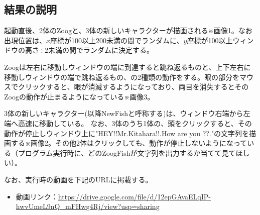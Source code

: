 \documentclass[dvipdfmx]{jsarticle}
\begin{document}
\subsection{結果の説明}
起動直後、2体のZoogと、3体の新しいキャラクターが描画される※画像1。なお出現位置は、$x$座標が100以上200未満の間でランダムに、$y$座標が100以上ウィンドウの高さ$\div 2$未満の間でランダムに決定する。\par
Zoogは左右に移動しウィンドウの端に到達すると跳ね返るものと、上下左右に移動しウィンドウの端で跳ね返るもの、の2種類の動作をする。眼の部分をマウスでクリックすると、眼が消滅するようになっており、両目を消失するとそのZoogの動作が止まるようになっている※画像3。\par
3体の新しいキャラクター(以降NewFishと呼称する)は、ウィンドウ右端から左端へ高速に移動している。
なお、3体のうち1体の、頭をクリックすると、その動作が停止しウィンドウ上に"HEY!!Mr.Kitahara!!.How are you ??."の文字列を描画する※画像2。その他2体はクリックしても、動作が停止しないようになっている（プログラム実行時に、どのZoogFishが文字列を出力するか当てて見てほしい）。\par
なお、実行時の動画を下記のURLに掲載する。
\begin{itemize}
  \item 動画リンク：\url{https://drive.google.com/file/d/12epGAvaELqIP-hwvUmeL9nQ_mFHwg4Rj/view?usp=sharing}
\end{itemize}
\end{document}
